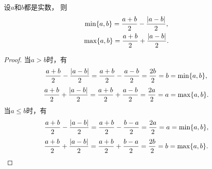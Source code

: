 \begin{proposition}
设\(a\)和\(b\)都是实数，
则\begin{gather}
	\min\{a,b\}
	= \frac{a+b}{2}
	- \frac{\abs{a-b}}{2}, \\
	\max\{a,b\}
	= \frac{a+b}{2}
	+ \frac{\abs{a-b}}{2}.
		\label{equation:绝对值函数.两个数的最大值}
\end{gather}
\begin{proof}
当\(a>b\)时，有\begin{equation*}
	\frac{a+b}{2} - \frac{\abs{a-b}}{2}
	= \frac{a+b}{2} - \frac{a-b}{2}
	= \frac{2b}{2} = b
	= \min\{a,b\},
\end{equation*}\begin{equation*}
	\frac{a+b}{2} + \frac{\abs{a-b}}{2}
	= \frac{a+b}{2} + \frac{a-b}{2}
	= \frac{2a}{2} = a
	= \max\{a,b\}.
\end{equation*}
当\(a \leq b\)时，有\begin{equation*}
	\frac{a+b}{2} - \frac{\abs{a-b}}{2}
	= \frac{a+b}{2} - \frac{b-a}{2}
	= \frac{2a}{2} = a
	= \min\{a,b\},
\end{equation*}\begin{equation*}
	\frac{a+b}{2} + \frac{\abs{a-b}}{2}
	= \frac{a+b}{2} + \frac{b-a}{2}
	= \frac{2b}{2} = b
	= \max\{a,b\}.
	\qedhere
\end{equation*}
\end{proof}
\end{proposition}
